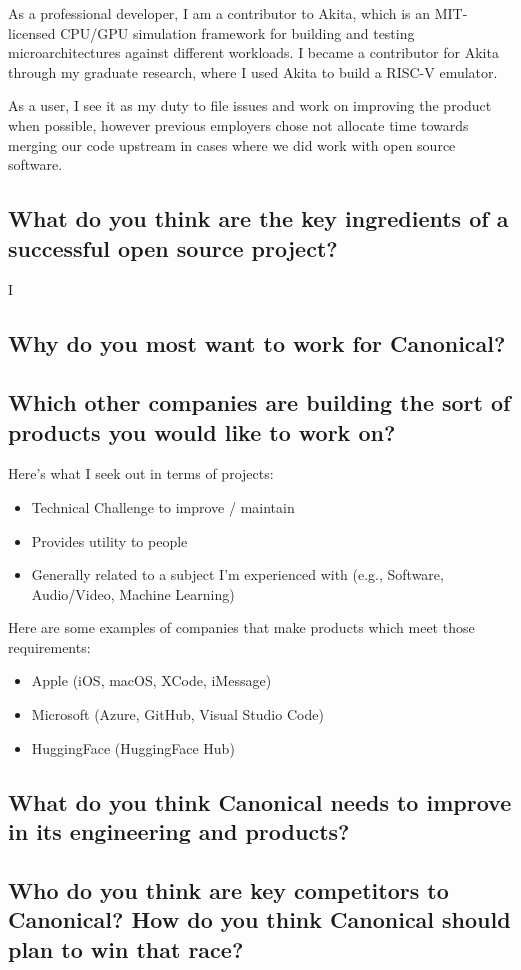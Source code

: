 \documentclass{article}
\begin{document}
As a professional developer, I am a contributor to Akita\cite{akita}, which is an MIT-licensed CPU/GPU
simulation framework for building and testing microarchitectures against different
workloads. I became a contributor for Akita through my graduate research, where I used
Akita to build a RISC-V emulator.

As a user, I see it as my duty to file issues and work on improving the product
when possible, however previous employers chose not allocate time towards
merging our code upstream in cases where we did work with open source software.

\subsection{What do you think are the key ingredients of a successful open
    source project?}
I

\subsection{Why do you most want to work for Canonical?}

\subsection{Which other companies are building the sort of products you would
    like to work on?}
Here's what I seek out in terms of projects:
\begin{itemize}
    \item Technical Challenge to improve / maintain
    \item Provides utility to people
    \item Generally related to a subject I'm experienced with (e.g., Software, Audio/Video, Machine Learning)
\end{itemize}
Here are some examples of companies that make products which meet those
requirements:
\begin{itemize}
    \item Apple (iOS, macOS, XCode, iMessage)
    \item Microsoft (Azure, GitHub, Visual Studio Code)
    \item HuggingFace (HuggingFace Hub)
\end{itemize} \subsection{What do you think Canonical needs to improve in its
    engineering and products?}
\subsection{Who do you think are key competitors to Canonical? How do you think
    Canonical should plan to win that race?}


\end{document}
